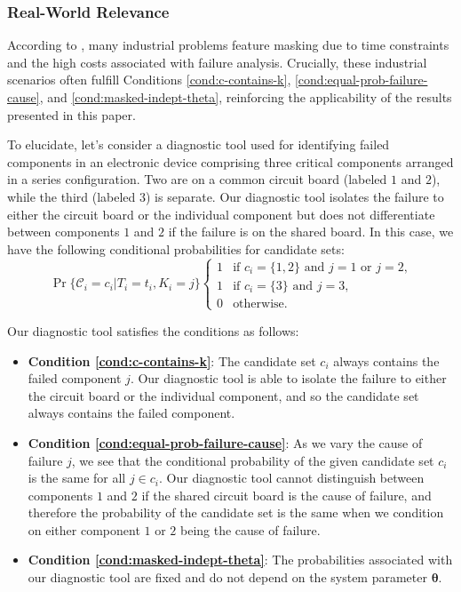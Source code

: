 \documentclass[
]{article}
\theoremstyle{definition}
\theoremstyle{plain}
\theoremstyle{definition}
\theoremstyle{definition}
\theoremstyle{definition}
\theoremstyle{definition}
\theoremstyle{remark}
\begin{document}
\hypertarget{real-world-relevance}{%
\subsubsection*{Real-World Relevance}\label{real-world-relevance}}

According to \citep{Fran-1991}, many industrial problems feature masking due to time
constraints and the high costs associated with failure analysis. Crucially,
these industrial scenarios often fulfill Conditions \ref{cond:c-contains-k},
\ref{cond:equal-prob-failure-cause}, and \ref{cond:masked-indept-theta},
reinforcing the applicability of the results presented in this paper.

To elucidate, let's consider a diagnostic tool used for identifying failed components in an electronic device comprising three critical components
arranged in a series configuration. Two are on a common circuit board (labeled \(1\) and
\(2\)), while the third (labeled \(3\)) is separate.
Our diagnostic tool isolates the failure to either the circuit board or
the individual component but does not differentiate between components \(1\) and \(2\)
if the failure is on the shared board. In this case, we have the following
conditional probabilities for candidate sets:
\[
\Pr\{\mathcal{C}_i = c_i | T_i = t_i, K_i = j\}
\begin{cases}
  1 & \text{if $c_i = \{1,2\}$ and $j = 1$ or $j = 2$,}\\
  1 & \text{if $c_i = \{3\}$   and $j = 3$,}\\
  0 & \text{otherwise.}
\end{cases}
\]

Our diagnostic tool satisfies the conditions as follows:

\begin{itemize}
\item
  \textbf{Condition \ref{cond:c-contains-k}}: The candidate set \(c_i\) always
  contains the failed component \(j\). Our diagnostic tool is able to isolate the
  failure to either the circuit board or the individual component, and so the
  candidate set always contains the failed component.
\item
  \textbf{Condition \ref{cond:equal-prob-failure-cause}}: As we vary the cause of
  failure \(j\), we see that the conditional probability of the given candidate set \(c_i\) is the
  same for all \(j \in c_i\). Our diagnostic tool cannot distinguish between
  components \(1\) and \(2\) if the shared circuit board is the cause of failure, and
  therefore the probability of the candidate set is the same when we condition on
  either component \(1\) or \(2\) being the cause of failure.
\item
  \textbf{Condition \ref{cond:masked-indept-theta}}: The probabilities associated
  with our diagnostic tool are fixed and do not depend on the system parameter
  \(\boldsymbol{\theta}\).
\end{itemize}
\end{document}
